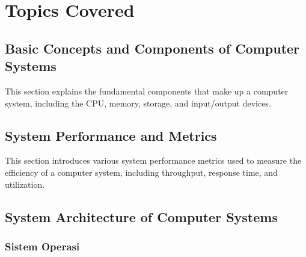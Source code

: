 \documentclass[12pt]{article}
\begin{document}
\section{Topics Covered}

\subsection{Basic Concepts and Components of Computer Systems}
This section explains the fundamental components that make up a computer system, including the CPU, memory, storage, and input/output devices.

\subsection{System Performance and Metrics}
This section introduces various system performance metrics used to measure the efficiency of a computer system, including throughput, response time, and utilization.

\subsection{System Architecture of Computer Systems}
\subsubsection{Sistem Operasi}
\end{document}
